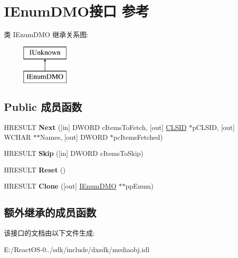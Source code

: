 \hypertarget{interface_i_enum_d_m_o}{}\section{I\+Enum\+D\+M\+O接口 参考}
\label{interface_i_enum_d_m_o}
类 I\+Enum\+D\+MO 继承关系图\+:\begin{figure}[H]
\begin{center}
\leavevmode
\includegraphics[height=2.000000cm]{interface_i_enum_d_m_o}
\end{center}
\end{figure}
\subsection*{Public 成员函数}
\begin{DoxyCompactItemize}
\item 
\mbox{\label{interface_i_enum_d_m_o_aa67dff5c99dd2443b5678bd3e60b065b}} 
H\+R\+E\+S\+U\+LT {\bfseries Next} (\mbox{[}in\mbox{]} D\+W\+O\+RD c\+Items\+To\+Fetch, \mbox{[}out\mbox{]} \hyperlink{struct___i_i_d}{C\+L\+S\+ID} $\ast$p\+C\+L\+S\+ID, \mbox{[}out\mbox{]} W\+C\+H\+AR $\ast$$\ast$Names, \mbox{[}out\mbox{]} D\+W\+O\+RD $\ast$pc\+Items\+Fetched)
\item 
\mbox{\label{interface_i_enum_d_m_o_a1d81999db995f889c17d089a82a15055}} 
H\+R\+E\+S\+U\+LT {\bfseries Skip} (\mbox{[}in\mbox{]} D\+W\+O\+RD c\+Items\+To\+Skip)
\item 
\mbox{\label{interface_i_enum_d_m_o_ae36716cda127092cbcfd1efc940db2c1}} 
H\+R\+E\+S\+U\+LT {\bfseries Reset} ()
\item 
\mbox{\label{interface_i_enum_d_m_o_a2af60898a423a9bdaa82ec255aba8ce5}} 
H\+R\+E\+S\+U\+LT {\bfseries Clone} (\mbox{[}out\mbox{]} \hyperlink{interface_i_enum_d_m_o}{I\+Enum\+D\+MO} $\ast$$\ast$pp\+Enum)
\end{DoxyCompactItemize}
\subsection*{额外继承的成员函数}


该接口的文档由以下文件生成\+:\begin{DoxyCompactItemize}
\item 
E\+:/\+React\+O\+S-\/0../sdk/include/dxsdk/mediaobj.\+idl\end{DoxyCompactItemize}
